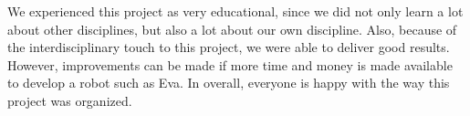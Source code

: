 \documentclass[project_eva.tex]{subfiles}
\begin{document}
We experienced this project as very educational, since we did not only learn a lot about other disciplines, but also a lot about our own discipline. Also, because of the interdisciplinary touch to this project, we were able to deliver good results. However, improvements can be made if more time and money is made available to develop a robot such as Eva. In overall, everyone is happy with the way this project was organized.
\end{document}
